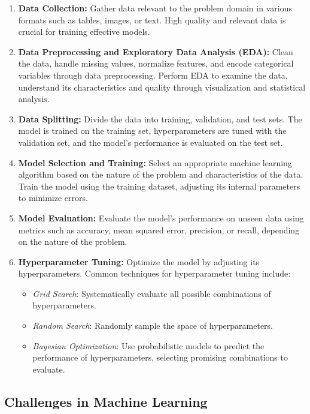 \begin{enumerate}
    \item \textbf{Data Collection:} Gather data relevant to the problem domain in various formats such as tables, images, or text. High quality and relevant data is crucial for training effective models.
    
    \item \textbf{Data Preprocessing and Exploratory Data Analysis (EDA):} Clean the data, handle missing values, normalize features, and encode categorical variables through data preprocessing. Perform EDA to examine the data, understand its characteristics and quality through visualization and statistical analysis.
    
    \item \textbf{Data Splitting:} Divide the data into training, validation, and test sets. The model is trained on the training set, hyperparameters are tuned with the validation set, and the model's performance is evaluated on the test set.
    
    \item \textbf{Model Selection and Training:} Select an appropriate machine learning algorithm based on the nature of the problem and characteristics of the data. Train the model using the training dataset, adjusting its internal parameters to minimize errors.
    
    \item \textbf{Model Evaluation:} Evaluate the model's performance on unseen data using metrics such as accuracy, mean squared error, precision, or recall, depending on the nature of the problem.
    
    \item \textbf{Hyperparameter Tuning:} Optimize the model by adjusting its hyperparameters. Common techniques for hyperparameter tuning include:
    \begin{itemize}
        \item \textit{Grid Search}: Systematically evaluate all possible combinations of hyperparameters.
        \item \textit{Random Search}: Randomly sample the space of hyperparameters.
        \item \textit{Bayesian Optimization}: Use probabilistic models to predict the performance of hyperparameters, selecting promising combinations to evaluate.
    \end{itemize}
\end{enumerate}


\subsection{Challenges in Machine Learning}

